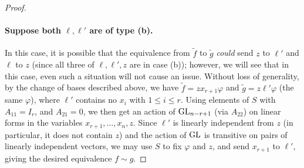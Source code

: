 \documentclass[11pt]{article}
\begin{document}
\begin{proof}
\paragraph{Suppose both $\ell,\ell'$ are of type (b).} In this case, it is possible that the equivalence from $\tilde f$ to $\tilde g$ \emph{could} send $z$ to $\ell'$ and $\ell$ to $z$ (since all three of $\ell,\ell',z$ are in case (b)); however, we will see that in this case, even such a situation will not cause an issue. Without loss of generality, by the change of bases described above, we have $\tilde f = z x_{r+1} \varphi$ and $\tilde g = z \ell' \varphi$ (the same $\varphi$), where $\ell'$ contains no $x_i$ with $1 \leq i \leq r$. Using elements of $S$ with $A_{11} = I_r$, and $A_{21} = 0$, we then get an action of $\mathrm{GL}_{n-r+1}$ (via $A_{22}$) on linear forms in the variables $x_{r+1}, \dotsc, x_n, z$. Since $\ell'$ is linearly independent from $z$ (in particular, it does not contain $z$) and the action of $\mathrm{GL}$ is transitive on pairs of linearly independent vectors, we may use $S$ to fix $\varphi$ and $z$, and send $x_{r+1}$ to $\ell'$, giving the desired equivalence $f \sim g$.
\end{proof}

\iffalse
\section{Equivalence between \GIlong and \AlgIsolong for algebras with square zero radical}
Although we do not need it for our other results, we show that Grigoriev's result extends to algebra $A$ such that $R(A)^2=0$, without any further condition; Grigoriev's result also used the condition that $A/R(A)$ was abelian.

\begin{proposition}[{cf. Grigoriev \cite[Theorem~1]{Grigoriev83}}]
\GIlong is equivalent to \AlgIsolong for algebras $A$ such that the radical squares to zero.
\end{proposition}

\begin{proof}
TODO
\end{proof}
\fi




\end{document}
